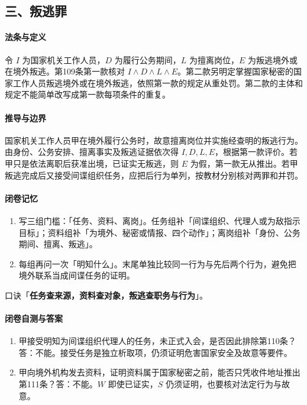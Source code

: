 \subsection*{三、叛逃罪}

\paragraph{法条与定义}
令 \(I\) 为国家机关工作人员，\(D\) 为履行公务期间，\(L\) 为擅离岗位，\(E\) 为叛逃境外或在境外叛逃。第109条第一款核对 \(I\land D\land L\land E\)。第二款另明定掌握国家秘密的国家工作人员叛逃境外或在境外叛逃，依照第一款的规定从重处罚。第二款的主体和规定不能简单改写成第一款每项条件的重复。

\paragraph{推导与边界}
国家机关工作人员甲在境外履行公务时，故意擅离岗位并实施经查明的叛逃行为。由身份、公务安排、擅离事实及叛逃证据依次得 \(I,D,L,E\)，根据第一款评价。若甲只是依法离职后获准出境，已证实无叛逃，则 \(E\) 为假，第一款无从推出。若甲叛逃完成后又接受间谍组织任务，应把后行为单列，按教材分别核对两罪和并罚。

\paragraph{闭卷记忆}
\begin{enumerate}
\item 写三组门槛：「任务、资料、离岗」。任务组补「间谍组织、代理人或为敌指示目标」；资料组补「为境外、秘密或情报、四个动作」；离岗组补「身份、公务期间、擅离、叛逃」。
\item 每组再问一次「明知什么」。末尾单独比较同一行为与先后两个行为，避免把境外联系当成间谍任务的证明。
\end{enumerate}
口诀「\textbf{任务查来源，资料查对象，叛逃查职务与行为}」。

\paragraph{闭卷自测与答案}
\begin{enumerate}
\item 甲接受明知为间谍组织代理人的任务，未正式入会，是否因此排除第110条？答：不能。接受任务是独立析取项，仍须证明危害国家安全及故意等要件。
\item 甲向境外机构发去资料，证明资料属于国家秘密之前，能否只凭收件地址推出第111条？答：不能。\(W\) 即使已证实，\(S\) 仍须证明，也要核对法定行为与故意。
\end{enumerate}
